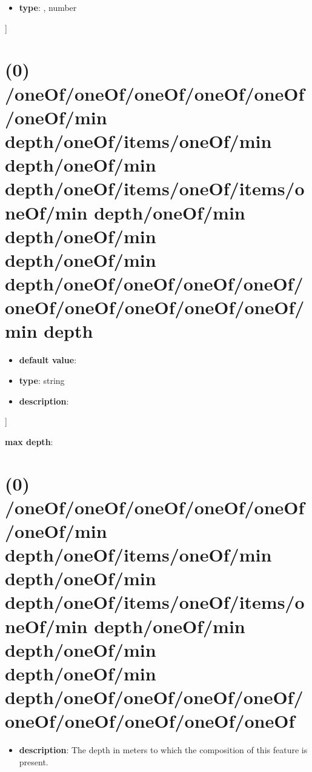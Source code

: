\begin{itemize}[leftmargin=5em]\item {\bf type}: , number\end{itemize}]\section{(0) /oneOf/oneOf/oneOf/oneOf/oneOf/oneOf/min depth/oneOf/items/oneOf/min depth/oneOf/min depth/oneOf/items/oneOf/items/oneOf/min depth/oneOf/min depth/oneOf/min depth/oneOf/min depth/oneOf/oneOf/oneOf/oneOf/oneOf/oneOf/oneOf/oneOf/oneOf/min depth}
\begin{itemize}[leftmargin=0em]\item {\bf default value}: 
\item {\bf type}: string
\item {\bf description}: 
\end{itemize}]\item {\bf max depth}: \section{(0) /oneOf/oneOf/oneOf/oneOf/oneOf/oneOf/min depth/oneOf/items/oneOf/min depth/oneOf/min depth/oneOf/items/oneOf/items/oneOf/min depth/oneOf/min depth/oneOf/min depth/oneOf/min depth/oneOf/oneOf/oneOf/oneOf/oneOf/oneOf/oneOf/oneOf/oneOf}
\begin{itemize}[leftmargin=0em]\item {\bf description}: The depth in meters to which the composition of this feature is present.
\end{itemize}
